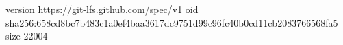version https://git-lfs.github.com/spec/v1
oid sha256:658cd8bc7b483c1a0ef4baa3617dc9751d99c96fc40b0cd11cb2083766568fa5
size 22004

